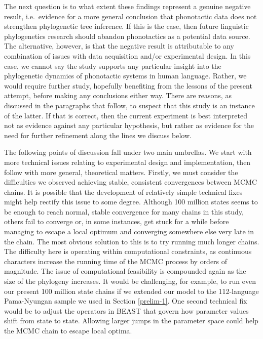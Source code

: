 \documentclass[]{article}
\begin{document}
The next question is to what extent these findings represent a genuine negative result, i.e.~evidence for a more general conclusion that phonotactic data does not strengthen phylogenetic tree inference. If this is the case, then future linguistic phylogenetics research should abandon phonotactics as a potential data source. The alternative, however, is that the negative result is attributable to any combination of issues with data acquisition and/or experimental design. In this case, we cannot say the study supports any particular insight into the phylogenetic dynamics of phonotactic systems in human language. Rather, we would require further study, hopefully benefiting from the lessons of the present attempt, before making any conclusions either way. There are reasons, as discussed in the paragraphs that follow, to suspect that this study is an instance of the latter. If that is correct, then the current experiment is best interpreted not as evidence against any particular hypothesis, but rather as evidence for the need for further refinement along the lines we discuss below.

The following points of discussion fall under two main umbrellas. We start with more technical issues relating to experimental design and implementation, then follow with more general, theoretical matters. Firstly, we must consider the difficulties we observed achieving stable, consistent convergences between MCMC chains. It is possible that the development of relatively simple technical fixes might help rectify this issue to some degree. Although 100 million states seems to be enough to reach normal, stable convergence for many chains in this study, others fail to converge or, in some instances, get stuck for a while before managing to escape a local optimum and converging somewhere else very late in the chain. The most obvious solution to this is to try running much longer chains. The difficulty here is operating within computational constraints, as continuous characters increase the running time of the MCMC process by orders of magnitude. The issue of computational feasibility is compounded again as the size of the phylogeny increases. It would be challenging, for example, to run even our present 100 million state chains if we extended our model to the 112-language Pama-Nyungan sample we used in Section \ref{prelim-1}. One second technical fix would be to adjust the operators in BEAST that govern how parameter values shift from state to state. Allowing larger jumps in the parameter space could help the MCMC chain to escape local optima.
\end{document}
